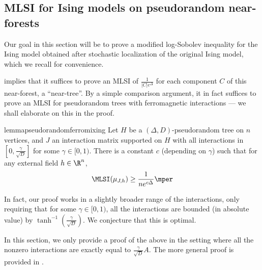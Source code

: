 \documentclass[11pt,letterpaper]{article}
\begin{document}
\subsection{MLSI for Ising models on pseudorandom near-forests}
\label{sec:mlsi-tree-ising}

    Our goal in this section will be to prove a modified log-Sobolev inequality for the Ising model obtained after stochastic localization of the original Ising model, which we recall for convenience.

    \mlsitree*

     implies that it suffices to prove an MLSI of $\frac{1}{|C| e^{\Delta}}$ for each component $C$ of this near-forest, a ``near-tree''. By a simple comparison argument, it in fact suffices to prove an MLSI for pseudorandom trees with ferromagnetic interactions --- we shall elaborate on this in the proof.

    \begin{restatable}{lemma}{pseudorandomferromixing}
        \label{lem:pseudorandom-ferro-mixing}
         Let $H$ be a $(\Delta,D)$-pseudorandom tree on $n$ vertices, and $J$ an interaction matrix supported on $H$ with all interactions in $\left[0, \frac{\gamma}{\sqrt{D}}\right]$ for some $\gamma \in [0,1)$.
        There is a constant $c$ (depending on $\gamma$) such that for any external field $h \in \R^n$,
        \[ \MLSI(\mu_{J,h}) \ge \frac{1}{ne^{c\Delta}}\mper \]
    \end{restatable}
    
    \begin{remark}
        In fact, our proof works in a slightly broader range of the interactions, only requiring that for some $\gamma \in [0,1)$, all the interactions are bounded (in absolute value) by $\tanh^{-1} \left( \frac{\gamma}{\sqrt{D}} \right)$. We conjecture that this is optimal. 
    \end{remark}
    
    In this section, we only provide a proof of the above in the setting where all the nonzero interactions are exactly equal to $\frac{\gamma}{\sqrt{D}}A$. The more general proof is provided in .
    
\end{document}
